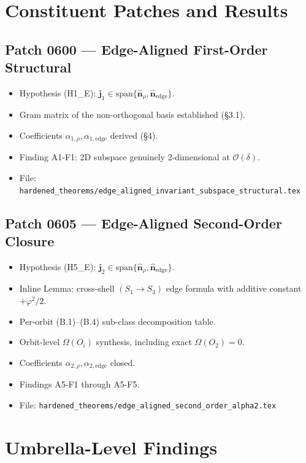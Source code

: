 \documentclass[11pt]{article}
\begin{document}
\section{Constituent Patches and Results}

\subsection*{Patch 0600 --- Edge-Aligned First-Order Structural}
\begin{itemize}
\item Hypothesis (H1\_E): $\mathbf{j}_1 \in
\mathrm{span}\{\hat{\mathbf{n}}_\rho, \hat{\mathbf{n}}_{\text{edge}}\}$.
\item Gram matrix of the non-orthogonal basis established (§3.1).
\item Coefficients $\alpha_{1,\rho}, \alpha_{1,\text{edge}}$ derived (§4).
\item Finding A1-F1: 2D subspace genuinely 2-dimensional at
$\mathcal{O}(\delta)$.
\item File: \texttt{hardened\_theorems/edge\_aligned\_invariant\_subspace\_structural.tex}
\end{itemize}

\subsection*{Patch 0605 --- Edge-Aligned Second-Order Closure}
\begin{itemize}
\item Hypothesis (H5\_E): $\mathbf{j}_2 \in
\mathrm{span}\{\hat{\mathbf{n}}_\rho, \hat{\mathbf{n}}_{\text{edge}}\}$.
\item Inline Lemma: cross-shell $(S_1 \to S_3)$ edge formula with
additive constant $+\varphi^2/2$.
\item Per-orbit (B.1)--(B.4) sub-class decomposition table.
\item Orbit-level $\Omega(O_i)$ synthesis, including exact
$\Omega(O_2) = 0$.
\item Coefficients $\alpha_{2,\rho}, \alpha_{2,\text{edge}}$ closed.
\item Findings A5-F1 through A5-F5.
\item File: \texttt{hardened\_theorems/edge\_aligned\_second\_order\_alpha2.tex}
\end{itemize}

\section{Umbrella-Level Findings}
\end{document}

